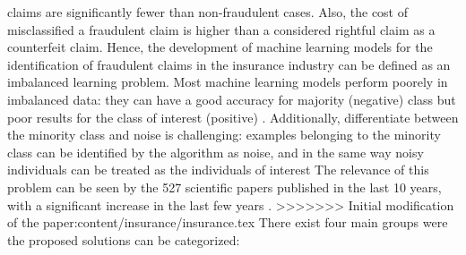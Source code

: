 \documentclass[parskip=full]{scrartcl}
\begin{document}
claims are significantly fewer than non-fraudulent cases. Also, the cost of 
misclassified a fraudulent claim is higher than a considered rightful claim as 
a counterfeit claim. Hence, the development of machine learning models for the 
identification of fraudulent claims in the insurance industry can be defined as 
an imbalanced learning problem. Most machine learning models perform poorely in 
imbalanced data: they can have a good accuracy for majority (negative) class 
but poor results for the class of interest (positive) \cite{HaiboHe2009}.
Additionally, differentiate between the minority class and noise is 
challenging: examples belonging to the minority class can be identified by the 
algorithm as noise, and in the same way noisy individuals can be 
treated as the individuals of interest \cite{Beyan2015}
The relevance of this problem can be seen by the 527 scientific papers 
published in the last 10 years, with a significant increase in the last few 
years \cite{Haixiang2017}. 
>>>>>>> Initial modification of the paper:content/insurance/insurance.tex
There exist four main groups were the proposed solutions can be categorized: 





\end{document}

